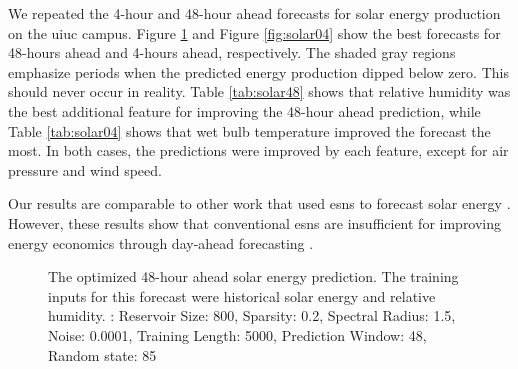 We repeated the 4-hour and 48-hour ahead forecasts for solar energy production
on the \gls{uiuc} campus. Figure \ref{fig:solar48} and Figure \ref{fig:solar04}
show the best forecasts for 48-hours ahead and 4-hours ahead, respectively. The
shaded gray regions emphasize periods when   the predicted energy production
dipped below zero. This should never occur in reality. Table \ref{tab:solar48} 
shows that relative humidity was the best additional feature for improving the
48-hour ahead prediction, while Table \ref{tab:solar04} shows that wet bulb
temperature improved the forecast the most. In both cases, the predictions were
improved by each feature, except for air pressure and wind speed.

Our results are comparable to other work that used \glspl{esn} to forecast
solar energy \cite{li_echo_2019}.
However, these results show that conventional \glspl{esn} are insufficient for
improving energy economics through day-ahead forecasting
\cite{brancucci_martinez-anido_value_2016}.

\begin{figure}[H]
  \centering
  \resizebox{\columnwidth}{!}{}
  \caption{The optimized 48-hour ahead solar energy prediction. The training inputs for
  this forecast were historical solar energy and relative humidity.
  : Reservoir Size: 800, Sparsity: 0.2, Spectral Radius:
  1.5, Noise: 0.0001, Training Length: 5000, Prediction Window: 48, Random
  state: 85}
  \label{fig:solar48}
\end{figure}

\begin{table*}[ht]
  \centering
  \caption{Tabulated error for 48-hour ahead solar energy forecasts with
  various coupled quantities.}
  \label{tab:solar48}
\end{table*}
